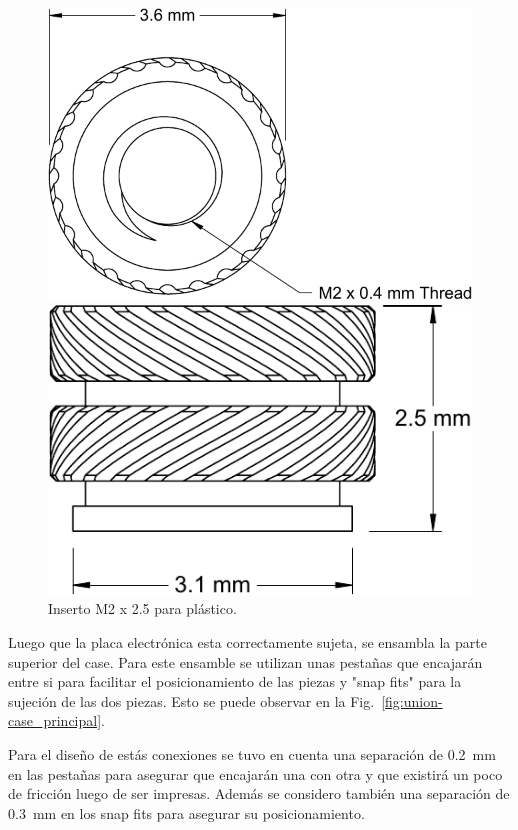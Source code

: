 \begin{figure} [hbt!]
\centering
\begin{minipage}{.5\textwidth}
  \centering
  \includegraphics[width=.9\linewidth]{insert_1.pdf}
\end{minipage}%
\begin{minipage}{.5\textwidth}
  \centering
  \includegraphics[width=.7\linewidth]{insert_2.pdf}
\end{minipage}
\caption{Inserto M2 x 2.5 para plástico.}
\label{fig:insert}
\end{figure}

Luego que la placa electrónica esta correctamente sujeta, se ensambla la parte superior del case. Para este ensamble se utilizan unas pestañas que encajarán entre si para facilitar el posicionamiento de las piezas y "snap fits" para la sujeción de las dos piezas. Esto se puede observar en la Fig.~\ref{fig:union-case_principal}.

Para el diseño de estás conexiones se tuvo en cuenta una separación de \SI{0.2}{mm} en las pestañas para asegurar que encajarán una con otra y que existirá un poco de fricción luego de ser impresas. Además se considero también una separación de \SI{0.3}{mm} en los snap fits para asegurar su posicionamiento.

